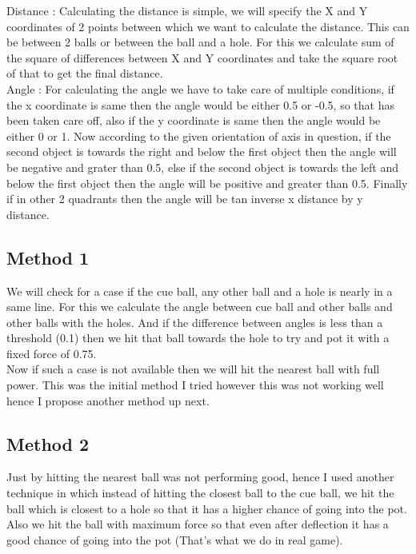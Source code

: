 \documentclass{article}
\begin{document}
Distance : Calculating the distance is simple, we will specify the X and Y coordinates of 2 points between which we want to calculate the distance. This can be between 2 balls or between the ball and a hole. For this we calculate sum of the square of differences between X and Y coordinates and take the square root of that to get the final distance.\\

Angle : For calculating the angle we have to take care of multiple conditions, if the x coordinate is same then the angle would be either 0.5 or -0.5, so that has been taken care off, also if the y coordinate is same then the angle would be either 0 or 1. Now according to the given orientation of axis in question, if the second object is towards the right and below the first object then the angle will be negative and grater than 0.5, else if the second object is towards the left and below the first object then the angle will be positive and greater than 0.5. Finally if in other 2 quadrants then the angle will be tan inverse x distance by y distance.

\subsection{Method 1}

We will check for a case if the cue ball, any other ball and a hole is nearly in a same line. For this we calculate the angle between cue ball and other balls and other balls with the holes. And if the difference between angles is less than a threshold (0.1) then we hit that ball towards the hole to try and pot it with a fixed force of 0.75. \\

Now if such a case is not available then we will hit the nearest ball with full power. This was the initial method I tried however this was not working well hence I propose another method up next.

\subsection{Method 2}

Just by hitting the nearest ball was not performing good, hence I used another technique in which instead of hitting the closest ball to the cue ball, we hit the ball which is closest to a hole so that it has a higher chance of going into the pot. Also we hit the ball with maximum force so that even after deflection it has a good chance of going into the pot (That's what we do in real game).
\end{document}
